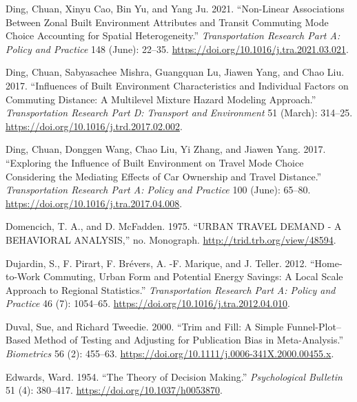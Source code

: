 \documentclass[
  11pt,
  openany]{memoir}
\newlength{\cslhangindent}
\newlength{\cslentryspacingunit} %
\newenvironment{CSLReferences}[2] %
 {%
  \setlength{\parindent}{0pt}
  \ifodd #1
  \let\oldpar\par
  \def\par{\hangindent=\cslhangindent\oldpar}
  \fi
  \setlength{\parskip}{#2\cslentryspacingunit}
 }%
 {}
\begin{document}
\begin{CSLReferences}{1}{0}
\leavevmode{}%
Ding, Chuan, Xinyu Cao, Bin Yu, and Yang Ju. 2021. {``Non-Linear Associations Between Zonal Built Environment Attributes and Transit Commuting Mode Choice Accounting for Spatial Heterogeneity.''} \emph{Transportation Research Part A: Policy and Practice} 148 (June): 22--35. \url{https://doi.org/10.1016/j.tra.2021.03.021}.

\leavevmode{}%
Ding, Chuan, Sabyasachee Mishra, Guangquan Lu, Jiawen Yang, and Chao Liu. 2017. {``Influences of Built Environment Characteristics and Individual Factors on Commuting Distance: A Multilevel Mixture Hazard Modeling Approach.''} \emph{Transportation Research Part D: Transport and Environment} 51 (March): 314--25. \url{https://doi.org/10.1016/j.trd.2017.02.002}.

\leavevmode{}%
Ding, Chuan, Donggen Wang, Chao Liu, Yi Zhang, and Jiawen Yang. 2017. {``Exploring the Influence of Built Environment on Travel Mode Choice Considering the Mediating Effects of Car Ownership and Travel Distance.''} \emph{Transportation Research Part A: Policy and Practice} 100 (June): 65--80. \url{https://doi.org/10.1016/j.tra.2017.04.008}.

\leavevmode{}%
Domencich, T. A., and D. McFadden. 1975. {``{URBAN TRAVEL DEMAND} - {A BEHAVIORAL ANALYSIS},''} no. Monograph. \url{http://trid.trb.org/view/48594}.

\leavevmode{}%
Dujardin, S., F. Pirart, F. Brévers, A. -F. Marique, and J. Teller. 2012. {``Home-to-Work Commuting, Urban Form and Potential Energy Savings: A Local Scale Approach to Regional Statistics.''} \emph{Transportation Research Part A: Policy and Practice} 46 (7): 1054--65. \url{https://doi.org/10.1016/j.tra.2012.04.010}.

\leavevmode{}%
Duval, Sue, and Richard Tweedie. 2000. {``Trim and {Fill}: A {Simple Funnel}-{Plot}--{Based Method} of {Testing} and {Adjusting} for {Publication Bias} in {Meta}-{Analysis}.''} \emph{Biometrics} 56 (2): 455--63. \url{https://doi.org/10.1111/j.0006-341X.2000.00455.x}.

\leavevmode{}%
Edwards, Ward. 1954. {``The Theory of Decision Making.''} \emph{Psychological Bulletin} 51 (4): 380--417. \url{https://doi.org/10.1037/h0053870}.


\end{CSLReferences}
\end{document}
